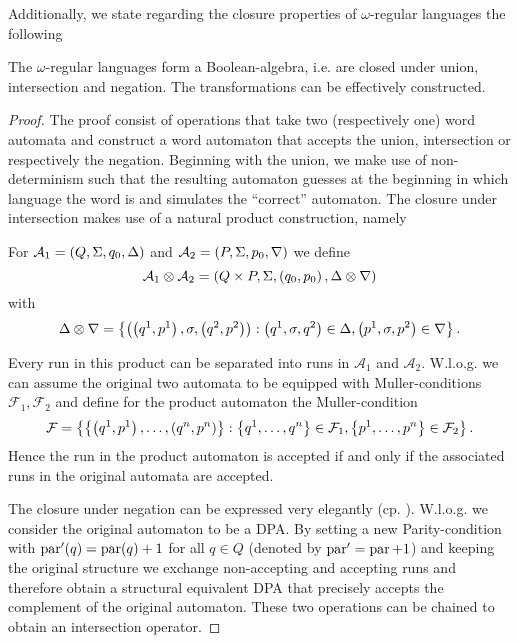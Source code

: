 Additionally, we state regarding the closure properties of $\omega$-regular
languages the following
\begin{theorem}
  \cite[Consequence from Theorem 1.5 and Theorem 1.24]{AutoLogInfGames}
  The $\omega$-regular languages form a Boolean-algebra, i.e. are closed under
  union, intersection and negation. The transformations can be effectively
  constructed.
  \label{thm:omegaregboolean}
\end{theorem}
\begin{proof}
  The proof consist of operations that take two (respectively one) word
  automata and construct a word automaton that accepts the union, intersection
  or respectively the negation. Beginning with the union, we make use of
  non-determinism such that the resulting automaton guesses at the beginning in
  which language the word is and simulates the \enquote{correct} automaton. The 
  closure under intersection makes use of a natural product construction,
  namely
  \begin{definition}
    For $\mathcal{A}_{1} = \left(Q, \Sigma, q_{0}, \Delta\right)$ and
    $\mathcal{A}_{2} = \left(P, \Sigma, p_{0}, \nabla\right)$ we define
    \begin{equation*}
      \mathcal{A}_{1}\otimes\mathcal{A}_{2} = \left(Q\times P, \Sigma, 
      \left(q_{0}, p_{0}\right), \Delta\otimes\nabla\right)
    \end{equation*}
    with
    \begin{equation*}
      \Delta\otimes\nabla = 
      \left\{\left(\left(q^{1}, p^{1}\right), \sigma, 
      \left(q^{2}, p^{2}\right)\right): \left(q^{1},\sigma, q^{2}\right)\in\Delta, 
      \left(p^{1},\sigma, p^{2}\right)\in\nabla\right\}.
    \end{equation*}
  \end{definition}
  Every run in this product can be separated into runs in $\mathcal{A}_{1}$ and
  $\mathcal{A}_{2}$. W.l.o.g. we can assume the original two automata to be
  equipped with Muller-conditions $\mathcal{F}_{1},\mathcal{F}_{2}$ and define
  for the product automaton the Muller-condition 
  \begin{equation*}
    \mathcal{F} = \left\{\left\{\left(q^{1}, p^{1}\right),\dots,\left(q^{n}, p^{n}\right)\right\}:
    \left\{q^{1},\dots,q^{n}\right\}\in\mathcal{F}_{1},
    \left\{p^{1},\dots,p^{n}\right\}\in\mathcal{F}_{2}\right\}.
  \end{equation*}
  Hence the run in the product automaton is accepted if and only if the
  associated runs in the original automata are accepted.

  The closure under negation can be expressed very elegantly (cp.
  \cite[Transformation 1.25.]{AutoLogInfGames}). W.l.o.g. we consider the
  original automaton to be a \ac{DPA}. By setting a new Parity-condition with
  $\operatorname{par}'(q) = \operatorname{par}(q) + 1$ for all $q\in Q$ (denoted by
  $\operatorname{par}' = \operatorname{par} + 1$) and keeping the original structure we exchange
  non-accepting and accepting runs and therefore obtain a structural equivalent
  \ac{DPA} that precisely accepts the complement of the original automaton.
  These two operations can be chained to obtain an intersection operator.
\end{proof}

